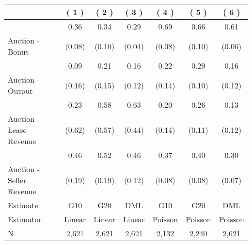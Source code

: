 
\begin{tabular}{lcccccc}
\toprule
  & ( 1 ) & ( 2 ) & ( 3 ) & ( 4 ) & ( 5 ) & ( 6 )\\
\midrule
 & 0.36 & 0.34 & 0.29 & 0.69 & 0.66 & 0.61\\

\multirow{-2}{*}{\raggedright\arraybackslash Auction - Bonus} & (0.08) & (0.10) & (0.04) & (0.08) & (0.10) & (0.06)\\

\midrule
 & 0.09 & 0.21 & 0.16 & 0.22 & 0.29 & 0.16\\

\multirow{-2}{*}{\raggedright\arraybackslash Auction - Output} & (0.16) & (0.15) & (0.12) & (0.14) & (0.10) & (0.12)\\

\midrule
 & 0.23 & 0.58 & 0.63 & 0.20 & 0.26 & 0.13\\

\multirow{-2}{*}{\raggedright\arraybackslash Auction - Lease Revenue} & (0.62) & (0.57) & (0.44) & (0.14) & (0.11) & (0.12)\\

\midrule
 & 0.46 & 0.52 & 0.46 & 0.37 & 0.40 & 0.30\\

\multirow{-2}{*}{\raggedright\arraybackslash Auction - Seller Revenue} & (0.19) & (0.19) & (0.12) & (0.08) & (0.08) & (0.07)\\

\midrule
Estimate & G10 & G20 & DML & G10 & G20 & DML\\

Estimator & Linear & Linear & Linear & Poisson & Poisson & Poisson\\

N & 2,621 & 2,621 & 2,621 & 2,132 & 2,240 & 2,621\\
\bottomrule
\end{tabular}
